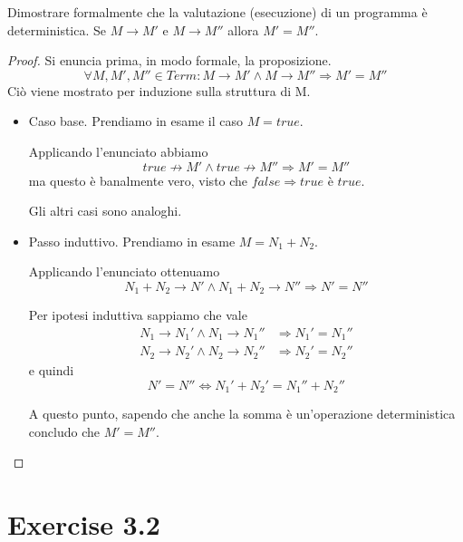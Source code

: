 \documentclass[12pt,a4paper,oneside]{book}
\begin{document}
\begin{exercise}
    Dimostrare formalmente che la valutazione (esecuzione) di un programma è deterministica. Se $M \to M'$ e $M \to M''$ allora $M' = M''$.
    
    \begin{proof}
        Si enuncia prima, in modo formale, la proposizione.
        \[
        \forall M, M', M'' \in Term: M \to M' \land M \to M'' \Rightarrow M' = M''
        \]
        Ciò viene mostrato per induzione sulla struttura di M.
        
        \begin{itemize}
            \item Caso base. Prendiamo in esame il caso $M = true$.
            
            Applicando l'enunciato abbiamo 
            \[
            true \not\to M' \land true \not\to M'' \Rightarrow M' = M''
            \]
            ma questo è banalmente vero, visto che $false \Rightarrow
            true$ è $true$.
            
            Gli altri casi sono analoghi.
            
            \item Passo induttivo. Prendiamo in esame $M = N_1 + N_2$.
            
            Applicando l'enunciato ottenuamo
            \[
            N_1 + N_2 \to N' \land N_1 + N_2 \to N'' \Rightarrow N' = N''
            \]
            
            Per ipotesi induttiva sappiamo che vale
            \begin{equation*}
            \begin{split}
            N_1 \to N_1' \land N_1 \to N_1'' & \Rightarrow N_1' = N_1'' \\
            N_2 \to N_2' \land N_2 \to N_2'' & \Rightarrow N_2' = N_2''
            \end{split}
            \end{equation*}
            e quindi
            \[
            N' = N'' \Leftrightarrow N_1' + N_2' = N_1'' + N_2''
            \]
            
            A questo punto, sapendo che anche la somma è un'operazione
            deterministica concludo che $M' = M''$.
        \end{itemize}
    \end{proof}
\end{exercise}

\section{Exercise 3.2}
\end{document}

